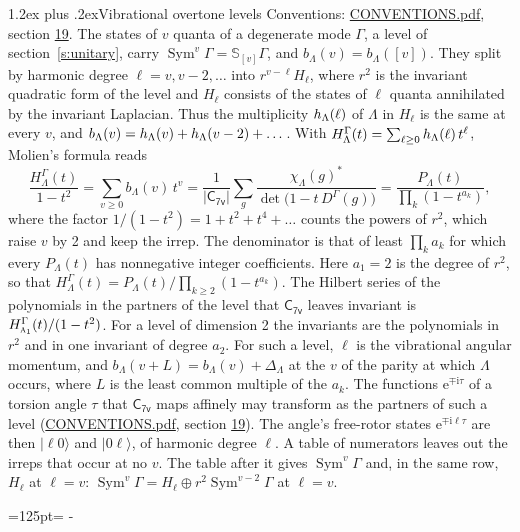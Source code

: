 \documentclass[10pt,a4paper]{article}
\makeatletter
\renewcommand\section{\@startsection{section}{1}{\z@}{-3ex plus -1ex minus -.2ex}%
  {1.2ex plus .2ex}{\normalfont\large\sffamily\bfseries\color{parttitle}}}
\newcommand{\needspace}[1]{\par\penalty-100\begingroup\dimen0=#1\relax\dimen2=\pagegoal
  \advance\dimen2-\pagetotal\ifdim\dimen0>\dimen2\relax\ifdim\dimen2>0pt\vfil\break\fi\fi
  \endgroup}
\numberwithin{equation}{section}
\newcommand{\grp}[1]{\mathsf{#1}}
\newcommand{\irr}[1]{\text{\normalfont\scshape #1}}
\newcommand{\iunit}{\mathrm{i}}
\newcommand{\expe}{\mathrm{e}}
\newcommand{\repD}[1]{D^{#1}}
\newcommand{\irchar}[1]{\chi_{#1}}
\newcommand{\conj}[1]{{#1}^{*}}
\newcommand{\schur}[1]{\mathbb{S}_{#1}}
\newcommand{\shape}[1]{[#1]}
\newcommand{\occ}[1]{\lvert #1\rangle}
\makeatother
\begin{document}
\section{Vibrational overtone levels}\label{s:overtones}
Conventions: \href{../../CONVENTIONS.pdf}{CONVENTIONS.pdf}, section \href{../../CONVENTIONS.pdf\#conv.19}{19}.
\leavevmode\label{n:index.quanta}\label{n:operator.symmetric.power}The states of $v$ quanta of a degenerate mode $\Gamma$, a level of section~\ref{s:unitary}, carry $\operatorname{Sym}^{v}\Gamma = \schur{\shape{v}}\Gamma$, and $b_\Lambda(v) = b_\Lambda(\shape{v})$. \label{n:local.quadratic.form}\label{n:set.harmonic}They split by harmonic degree $\ell = v, v - 2, \dots$ into $r^{v-\ell}H_\ell$, where $r^2$ is the invariant quadratic form of the level and $H_\ell$ consists of the states of $\ell$ quanta annihilated by the invariant Laplacian. \label{n:function.multiplicity.harmonic}Thus the multiplicity $\mathnormal{h}_\Lambda(\ell)$ of $\Lambda$ in $H_\ell$ is the same at every $v$, and $b_\Lambda(v) = \mathnormal{h}_\Lambda(v) + \mathnormal{h}_\Lambda(v - 2) + \dots$. \label{n:function.generating.level}With $H^{\Gamma}_\Lambda(t) = \sum_{\ell\ge0} \mathnormal{h}_\Lambda(\ell)\,t^{\ell}$, Molien's formula reads
\begin{equation}\label{e:molien}\frac{H^{\Gamma}_\Lambda(t)}{1 - t^2} = \sum_{v\ge0} b_\Lambda(v)\,t^v = \frac{1}{|\grp{C_{7v}}|}\sum_{g}\frac{\conj{\irchar{\Lambda}(g)}}{\det\bigl(1 - t\,\repD{\Gamma}(g)\bigr)} = \frac{P_\Lambda(t)}{\prod_k (1-t^{a_k})},\end{equation}
where the factor $1/(1 - t^2) = 1 + t^2 + t^4 + \dots$ counts the powers of $r^2$, which raise $v$ by 2 and keep the irrep. The denominator is that of least $\prod_k a_k$ for which every $P_\Lambda(t)$ has nonnegative integer coefficients. Here $a_1 = 2$ is the degree of $r^2$, so that $H^{\Gamma}_\Lambda(t) = P_\Lambda(t)/\prod_{k\ge2}(1 - t^{a_k})$. The Hilbert series of the polynomials in the partners of the level that $\grp{C_{7v}}$ leaves invariant is $H^{\Gamma}_{\irr{a}_{1}}(t)/(1 - t^2)$. For a level of dimension 2 the invariants are the polynomials in $r^2$ and in one invariant of degree $a_2$. \label{n:index.overtone.period}\label{n:index.increment.unitary}For such a level, $\ell$ is the vibrational angular momentum, and $b_\Lambda(v + L) = b_\Lambda(v) + \Delta_\Lambda$ at the $v$ of the parity at which $\Lambda$ occurs, where $L$ is the least common multiple of the $a_k$. \label{n:local.torsion.angle}The functions $\expe^{\mp\iunit\tau}$ of a torsion angle $\tau$ that $\grp{C_{7v}}$ maps affinely may transform as the partners of such a level (\href{../../CONVENTIONS.pdf}{CONVENTIONS.pdf}, section \href{../../CONVENTIONS.pdf\#conv.19}{19}). The angle's free-rotor states $\expe^{\mp\iunit\ell\tau}$ are then $\occ{\ell 0}$ and $\occ{0 \ell}$, of harmonic degree $\ell$. A table of numerators leaves out the irreps that occur at no $v$. The table after it gives $\operatorname{Sym}^{v}\Gamma$ and, in the same row, $H_\ell$ at $\ell = v$: $\operatorname{Sym}^{v}\Gamma = H_\ell \oplus r^2\operatorname{Sym}^{v-2}\Gamma$ at $\ell = v$.
\needspace{125pt}
\end{document}

